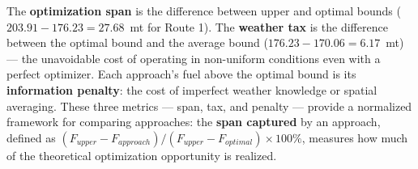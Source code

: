 \documentclass[review]{elsarticle}
\begin{document}
The \textbf{optimization span} is the difference between upper and optimal bounds ($203.91 - 176.23 = 27.68$~mt for Route 1). The \textbf{weather tax} is the difference between the optimal bound and the average bound ($176.23 - 170.06 = 6.17$~mt) --- the unavoidable cost of operating in non-uniform conditions even with a perfect optimizer. Each approach's fuel above the optimal bound is its \textbf{information penalty}: the cost of imperfect weather knowledge or spatial averaging. These three metrics --- span, tax, and penalty --- provide a normalized framework for comparing approaches: the \textbf{span captured} by an approach, defined as $(F_{upper} - F_{approach}) / (F_{upper} - F_{optimal}) \times 100\%$, measures how much of the theoretical optimization opportunity is realized.






\end{document}
